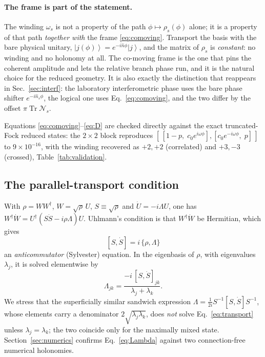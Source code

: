 \documentclass[11pt]{article}
\newcommand{\ket}[1]{\left|#1\right\rangle}
\newcommand{\Tr}{\operatorname{Tr}}
\newcommand{\nop}{\hat n}
\begin{document}
\paragraph{The frame is part of the statement.}
The winding $\omega_s$ is not a property of the path $\phi\mapsto\rho_s(\phi)$
alone; it is a property of that path \emph{together with} the frame
\eqref{eq:comoving}. Transport the basis with the bare physical unitary,
$\ket{j(\phi)}=e^{-i\nop\phi}\ket{j}$, and the matrix of $\rho_s$ is
\emph{constant}: no winding and no holonomy at all. The co-moving frame is the
one that pins the coherent amplitude and lets the relative branch phase run,
and it is the natural choice for the reduced geometry. It is also exactly the
distinction that reappears in Sec.~\ref{sec:interf}: the laboratory
interferometric phase uses the bare phase shifter $e^{-i\nop_s\phi}$, the
logical one uses Eq.~\eqref{eq:comoving}, and the two differ by the offset
$\pi\Tr\mathcal N_s$.

Equations \eqref{eq:comoving}--\eqref{eq:D} are checked directly against the
exact truncated-Fock reduced states: the $2\times2$ block reproduces
$[\,[1-p,\;c_0e^{i\omega\phi}],[c_0e^{-i\omega\phi},\;p]\,]$ to
$9\times10^{-16}$, with the winding recovered as $+2,+2$ (correlated) and
$+3,-3$ (crossed), Table~\ref{tab:validation}.

\subsection{The parallel-transport condition}

With $\rho=WW^\dagger$, $W=\sqrt\rho\,U$, $S\equiv\sqrt\rho$ and
$\dot U=-i\Lambda U$, one has
$W^\dagger\dot W=U^\dagger(S\dot S-i\rho\Lambda)U$. Uhlmann's condition is that
$W^\dagger\dot W$ be Hermitian, which gives
\begin{equation}
\boxed{\;[S,\dot S]=i\,\{\rho,\Lambda\}\;}
\label{eq:transport}
\end{equation}
an \emph{anticommutator} (Sylvester) equation. In the eigenbasis of $\rho$,
with eigenvalues $\lambda_j$, it is solved elementwise by
\begin{equation}
\Lambda_{jk}=\frac{-i\,[S,\dot S]_{jk}}{\lambda_j+\lambda_k}.
\label{eq:Lambda}
\end{equation}
We stress that the superficially similar sandwich expression
$\Lambda=\frac{1}{2i}S^{-1}[S,\dot S]S^{-1}$, whose elements carry a
denominator $2\sqrt{\lambda_j\lambda_k}$, does \emph{not} solve
Eq.~\eqref{eq:transport} unless $\lambda_j=\lambda_k$; the two coincide only
for the maximally mixed state. Section~\ref{sec:numerics} confirms
Eq.~\eqref{eq:Lambda} against two connection-free numerical holonomies.
\end{document}

